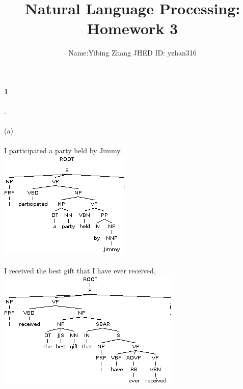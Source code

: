 \documentclass[11pt]{article}
\title{Natural Language Processing: Homework 3}
\author{Name:Yibing Zhang   JHED ID: yzhan316 }
\begin{document}
\large
	\maketitle
	\thispagestyle{headings}
	
	\vspace{-.5in}


	
	\paragraph{1}.\\
\\
(a)\\
\\
I participated a party held by Jimmy.\\
\includegraphics[width=0.8\linewidth]{parse1.png}\\
\\
I received the best gift that I have ever received.\\
\includegraphics[width=0.8\linewidth]{parse2.png}\\
\end{document}
